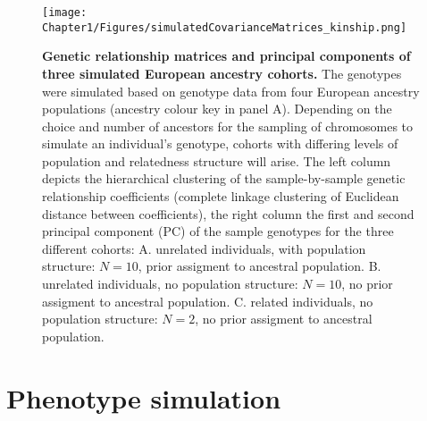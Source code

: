 \begin{figure}[htbp]
	\centering
	\texttt{[image: Chapter1/Figures/simulatedCovarianceMatrices\_kinship.png]}
	\caption[\textbf{Genetic relationship matrices and principal components of three simulated European ancestry cohorts.}]{\textbf{Genetic relationship matrices and principal components of three simulated European ancestry cohorts.} The genotypes were simulated based on genotype data from four European ancestry populations (ancestry colour key in panel A). Depending on the choice and number of ancestors for the sampling of chromosomes to simulate an individual's genotype, cohorts with differing levels of population and relatedness structure will arise. The left column depicts the hierarchical clustering of the sample-by-sample  genetic relationship coefficients (complete linkage clustering of Euclidean distance between coefficients), the right column the first and second principal component (PC) of the sample genotypes for the three different cohorts: A. unrelated individuals, with population structure: \(N=10\), prior assigment to ancestral population. B. unrelated individuals, no population structure: \(N=10\), no prior assigment to ancestral population. C. related individuals, no population structure: \(N=2\), no prior assigment to ancestral population.}
 	\label{fig:kinship-matrices}
\end{figure}


\section{Phenotype simulation}
\label{section:phenotype-simulation}

